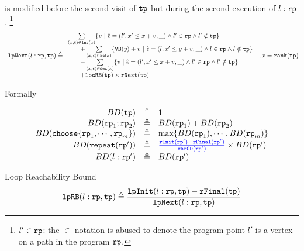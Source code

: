 \begin{defn}
\begin{itemize}
is modified before
the second visit of $\mathtt{tp}$ but during the second execution of $l: \mathtt{rp}$.
\footnote{$l' \in \mathtt{rp}$: the $\in$ notation is abused to denote
the program point $l'$ is a vertex on a path in the program $\mathtt{rp}$.}
%
\[
  \begin{array}{l}
  \lpnext(l: \rprog, \tpath) \triangleq 
    \begin{array}{l}
  \sum\limits_{(x, \absevent) \in \inc(x) }
  \left\{ 
      v ~\middle\vert~ \absevent = (l', x' \leq x + v, \_) \land  l' \in \rprog 
      \land l' \notin \tpath \right\}
      \\ \qquad 
      + \sum\limits_{(x, \absevent) \in \reset(x) }
         \left\{ \varinvar(y) + v ~\middle\vert~ \absevent = (l, x' \leq y + v, \_) \land l \in \rprog \land l \notin \tpath\right\}
     \\ \qquad 
      - \sum\limits_{(x, \absevent) \in \dec(x) }\left\{ 
      v 
      ~\middle\vert~ \absevent = (l', x' \leq x + v, \_) \land l' \in \rprog \land l' \notin \tpath \right\}
      \\ \qquad 
      + \outinB(\tpath) \times \rfnext(\tpath)
    \end{array}
  \end{array}
  , x = \locbound(\tpath)
  \]
    \end{itemize}
\end{defn}

Formally
\begin{defn}
\label{def:loopbound}
\[
  \begin{array}{rcl}
    BD(\tpath) & \triangleq & 1 \\
    BD(\rprog_1;\rprog_2) & \triangleq & BD(\rprog_1) + BD(\rprog_2) \\
    BD(\rpchoose{\rprog_1, \cdots, \rprog_m }) & \triangleq 
    & \max\left\{ BD(\rprog_1), \cdots, BD(\rprog_m) \right\} \\
    BD(\rprepeat(\rprog')) & \triangleq 
    &
    \highlight{\frac{\rfinit(\rprog') - \rffinal(\rprog')}{\varGD(\rprog')}}
     \times BD(\rprog')
     \\
    BD(l: \rprog') & \triangleq & BD(\rprog')
  \end{array}
  \]
\end{defn}

\begin{defn}
  \label{def:looprb}
  Loop Reachability Bound
  \[
    \mathtt{lpRB}(l: \mathtt{rp}, \mathtt{tp}) \triangleq
      \frac{\mathtt{lpInit}(l: \mathtt{rp}, \mathtt{tp}) - \mathtt{rFinal}(\mathtt{tp})}{\mathtt{lpNext}(l: \mathtt{rp}, \mathtt{tp})}
  \]
\end{defn}